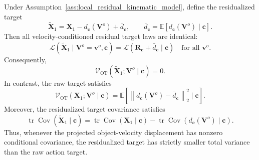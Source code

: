 \documentclass{article} %
\begin{document}
\begin{theorem}
\label{thm:velocity_residualization_reduces_variation}
Under Assumption~\ref{ass:local_residual_kinematic_model}, define the
residualized target
\begin{equation}
    \widetilde{\mathbf X}_1
    =
    \mathbf X_1
    -
    d_{\mathbf c}(\mathbf V^{o})
    +
    \bar d_{\mathbf c},
    \qquad
    \bar d_{\mathbf c}
    =
    \mathbb E
    [
        d_{\mathbf c}(\mathbf V^{o})
        \mid
        \mathbf c
    ].
    \label{eq:residualized_target_variance_analysis}
\end{equation}
Then all velocity-conditioned residual target laws are identical:
\begin{equation}
    \mathcal L
    \left(
        \widetilde{\mathbf X}_1
        \mid
        \mathbf V^{o}=\mathbf v^{o},
        \mathbf c
    \right)
    =
    \mathcal L
    \left(
        \mathbf R_{\mathbf c}
        +
        \bar d_{\mathbf c}
        \mid
        \mathbf c
    \right)
    \quad
    \text{for all } \mathbf v^{o}.
    \label{eq:residual_laws_identical}
\end{equation}
Consequently,
\begin{equation}
    \mathcal V_{\mathrm{OT}}
    (
        \widetilde{\mathbf X}_1;
        \mathbf V^{o}
        \mid
        \mathbf c
    )
    =
    0.
    \label{eq:residual_ot_zero}
\end{equation}
In contrast, the raw target satisfies
\begin{equation}
    \mathcal V_{\mathrm{OT}}
    (
        \mathbf X_1;
        \mathbf V^{o}
        \mid
        \mathbf c
    )
    =
    \mathbb E
    \left[
        \left\|
            d_{\mathbf c}(\mathbf V^{o})
            -
            \bar d_{\mathbf c}
        \right\|_2^2
        \mid
        \mathbf c
    \right].
    \label{eq:ot_variability_value}
\end{equation}
Moreover, the residualized target covariance satisfies
\begin{equation}
    \operatorname{tr}
    \operatorname{Cov}
    (
        \widetilde{\mathbf X}_1
        \mid
        \mathbf c
    )
    =
    \operatorname{tr}
    \operatorname{Cov}
    (
        \mathbf X_1
        \mid
        \mathbf c
    )
    -
    \operatorname{tr}
    \operatorname{Cov}
    (
        d_{\mathbf c}(\mathbf V^{o})
        \mid
        \mathbf c
    ).
    \label{eq:covariance_reduction}
\end{equation}
Thus, whenever the projected object-velocity displacement has nonzero
conditional covariance, the residualized target has strictly smaller total
variance than the raw action target.
\end{theorem}
\end{document}

